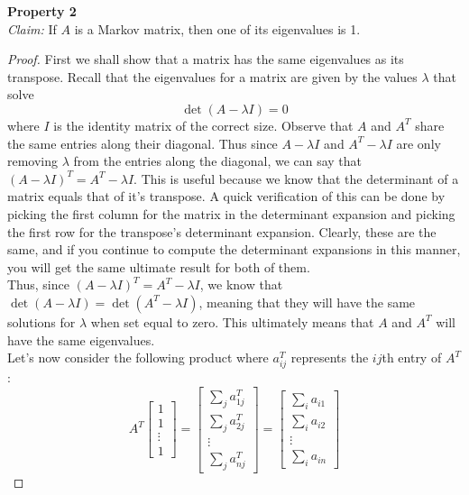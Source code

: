 \documentclass[10pt]{article}
\begin{document}
\textbf{Property 2}\\
\textit{Claim:} If $A$ is a Markov matrix, then one of its eigenvalues is 1.
\begin{proof}
First we shall show that a matrix has the same eigenvalues as its transpose. Recall that the eigenvalues for a matrix are given by the values $\lambda$ that solve
\[\det(A-\lambda I) = 0\]
where $I$ is the identity matrix of the correct size. Observe that $A$ and $A^T$ share the same entries along their diagonal. Thus since $A-\lambda I$ and $A^T-\lambda I$ are only removing $\lambda$ from the entries along the diagonal, we can say that $(A-\lambda I)^T=A^T-\lambda I$. This is useful because we know that the determinant of a matrix equals that of it's transpose. A quick verification of this can be done by picking the first column for the matrix in the determinant expansion and picking the first row for the transpose's determinant expansion. Clearly, these are the same, and if you continue to compute the determinant expansions in this manner, you will get the same ultimate result for both of them.\vspace{0.5cm}\\
Thus, since $(A-\lambda I)^T=A^T-\lambda I$, we know that $\det(A-\lambda I) = \det(A^T-\lambda I)$, meaning that they will have the same solutions for $\lambda$ when set equal to zero. This ultimately means that $A$ and $A^T$ will have the same eigenvalues.\vspace{0.5cm}\\
Let's now consider the following product where $a^T_{ij}$ represents the $ij$th entry of $A^T$:
\[A^T \left[\begin{array}{c}
     1\\
     1\\
     \vdots\\
     1
\end{array}\right] = \left[\begin{array}{c}
     \sum_{j} a_{1j}^T\\[4pt]
     \sum_{j} a_{2j}^T\\
     \vdots\\
     \sum_{j} a_{nj}^T
\end{array}\right] = \left[\begin{array}{c}
     \sum_{i} a_{i1}\\
     \sum_{i} a_{i2}\\
     \vdots\\
     \sum_{i} a_{in}
\end{array}\right]\]

\end{proof}
\end{document}
